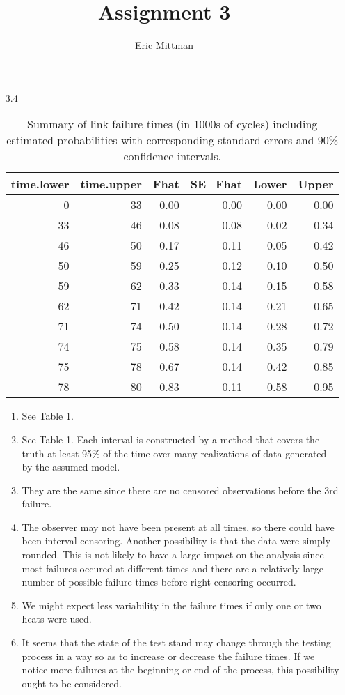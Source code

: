\documentclass[12pt]{article}\usepackage[]{graphicx}\usepackage[]{color}
\author{Eric Mittman}
\title{Assignment 3}
\begin{document}
  \maketitle
\begin{enumerate}
  \item[3.4]
\begin{table}[ht]
\centering
\begin{tabular}{rrrrrr}
  \hline
time.lower & time.upper & Fhat & SE\_Fhat & Lower & Upper \\ 
  \hline
  0 &  33 & 0.00 & 0.00 & 0.00 & 0.00 \\ 
   33 &  46 & 0.08 & 0.08 & 0.02 & 0.34 \\ 
   46 &  50 & 0.17 & 0.11 & 0.05 & 0.42 \\ 
   50 &  59 & 0.25 & 0.12 & 0.10 & 0.50 \\ 
   59 &  62 & 0.33 & 0.14 & 0.15 & 0.58 \\ 
   62 &  71 & 0.42 & 0.14 & 0.21 & 0.65 \\ 
   71 &  74 & 0.50 & 0.14 & 0.28 & 0.72 \\ 
   74 &  75 & 0.58 & 0.14 & 0.35 & 0.79 \\ 
   75 &  78 & 0.67 & 0.14 & 0.42 & 0.85 \\ 
   78 &  80 & 0.83 & 0.11 & 0.58 & 0.95 \\ 
   \hline
\end{tabular}
\caption{Summary of link failure times (in 1000s of cycles) including estimated probabilities with corresponding standard errors and 90\% confidence intervals.} 
\end{table}

  
  \begin{enumerate}
    \item
    See Table 1.
    \item
    See Table 1. Each interval is constructed by a method that covers the truth at least 95\% of the time over many realizations of data generated by the assumed model.
    \item
    They are the same since there are no censored observations before the 3rd failure.
    \item
    The observer may not have been present at all times, so there could have been interval censoring. Another possibility is that the data were simply rounded. This is not likely to have a large impact on the analysis since most failures occured at different times and there are a relatively large number of possible failure times before right censoring occurred.
    \item
    We might expect less variability in the failure times if only one or two heats were used.
    \item
    It seems that the state of the test stand may change through the testing process in a way so as to increase or decrease the failure times. If we notice more failures at the beginning or end of the process, this possibility ought to be considered.
  \end{enumerate}
  

\end{enumerate}
\end{document}
